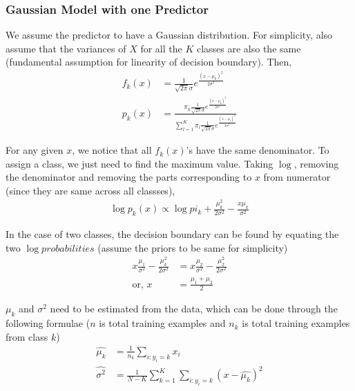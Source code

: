 \documentclass[11pt, a4paper]{article}
\begin{document}
    \subsubsection{Gaussian Model with one Predictor}
    We assume the predictor to have a Gaussian distribution. For simplicity, also assume that the variances of $X$ for all the $K$ classes are also the same (fundamental assumption for linearity of decision boundary). Then,
    \begin{align*}
        f_{k}(x) &= \frac{1}{\sqrt{2\pi}\sigma}e^{\frac{(x-\mu_{k})^{2}}{2\sigma^{2}}}\\
        p_{k}(x) &= \frac{\pi_{k}\frac{1}{\sqrt{2\pi}\sigma}e^{\frac{(x-\mu_{k})^{2}}{2\sigma^{2}}}}{\sum_{l=1}^{K}\pi_{l}\frac{1}{\sqrt{2\pi}\sigma}e^{\frac{(x-\mu_{l})^{2}}{2\sigma^{2}}}}
    \end{align*}
    
    For any given $x$, we notice that all $f_{k}(x)$'s have the same denominator. To assign a class, we just need to find the maximum value. Taking $\log$, removing the denominator and removing the parts corresponding to $x$ from numerator (since they are same across all classses),
    \begin{align*}
        \log{p_{k}(x)} \propto \log{pi_{k}} + \frac{\mu_{k}^{2}}{2\sigma^{2}} - \frac{x\mu_{k}}{\sigma^{2}}
    \end{align*}

    In the case of two classes, the decision boundary can be found by equating the two $\log probabilities$ (assume the priors to be same for simplicity)
    \begin{align*}
        x\frac{\mu_{1}}{\sigma^{2}} - \frac{\mu_{k}^{2}}{2\sigma^{2}} &= x\frac{\mu_{2}}{\sigma^{2}} - \frac{\mu_{2}^{2}}{2\sigma^{2}} \\
        \text{or, } x &= \frac{\mu_{1} + \mu_{2}}{2} 
    \end{align*}

    $\mu_{k}$ and $\sigma^{2}$ need to be estimated from the data, which can be done through the following formulae ($n$ is total training examples and $n_{k}$ is total training examples from class $k$)
    \begin{align*}
        \hat{\mu_{k}} &= \frac{1}{n_{k}} \sum_{i:y_{i}=k}x_{i}\\
        \hat{\sigma^{2}} &= \frac{1}{N - K}\sum_{k=1}^{K}\sum_{i:y_{i}=k}(x-\hat{\mu_{k}})^{2}
    \end{align*}
\end{document}
